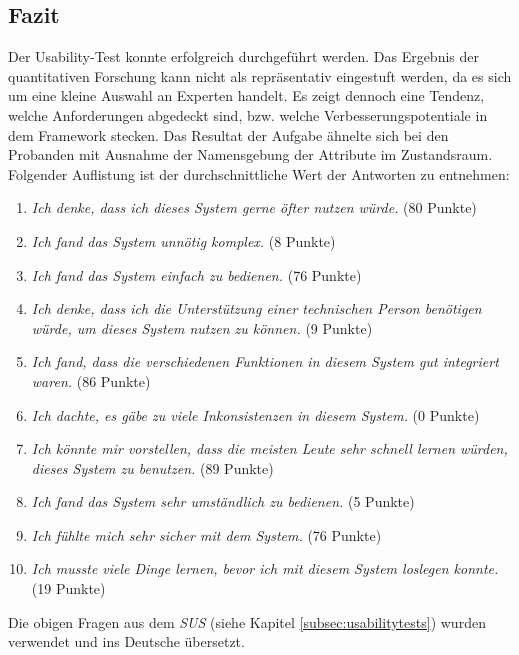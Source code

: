     \subsection{Fazit}
    \label{subsec:usabilityFazit}
        Der Usability-Test konnte erfolgreich durchgeführt werden.
        Das Ergebnis der quantitativen Forschung kann nicht als repräsentativ eingestuft werden, da es sich um eine kleine Auswahl an Experten handelt. Es zeigt dennoch eine Tendenz, 
        welche Anforderungen abgedeckt sind, bzw. welche Verbesserungspotentiale in dem Framework stecken.  
        Das Resultat der Aufgabe ähnelte sich bei den Probanden mit Ausnahme der Namensgebung der Attribute im Zustandsraum. 
        \\
        Folgender Auflistung ist der durchschnittliche Wert der Antworten zu entnehmen:
        \begin{enumerate}
            \item \textit{Ich denke, dass ich dieses System gerne öfter nutzen würde.} (80 Punkte)
            \item \textit{Ich fand das System unnötig komplex.} (8 Punkte)
            \item \textit{Ich fand das System einfach zu bedienen.} (76 Punkte)
            \item \textit{Ich denke, dass ich die Unterstützung einer technischen Person benötigen würde, um dieses System nutzen zu können.} (9 Punkte)
            \item \textit{Ich fand, dass die verschiedenen Funktionen in diesem System gut integriert waren.} (86 Punkte)
            \item \textit{Ich dachte, es gäbe zu viele Inkonsistenzen in diesem System.} (0 Punkte)
            \item \textit{Ich könnte mir vorstellen, dass die meisten Leute sehr schnell lernen würden, dieses System zu benutzen.} (89 Punkte)
            \item \textit{Ich fand das System sehr umständlich zu bedienen.} (5 Punkte)
            \item \textit{Ich fühlte mich sehr sicher mit dem System.} (76 Punkte)
            \item \textit{Ich musste viele Dinge lernen, bevor ich mit diesem System loslegen konnte.} (19 Punkte)
        \end{enumerate}
        Die obigen Fragen aus dem \textit{SUS} \cite{brook1995} (siehe Kapitel \ref{subsec:usabilitytests}) wurden verwendet und ins Deutsche übersetzt. 
        \\
